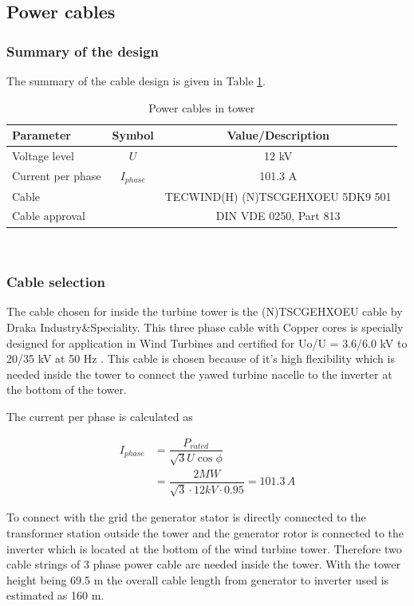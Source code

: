 \subsection{Power cables}

\subsubsection{Summary of the design}
The summary of the cable design is given in Table \ref{tab:power_cables}.

\begin{table}[h]
\centering
\caption{Power cables in tower}
\label{tab:power_cables}
\begin{tabular}{ |l|c|c|} 
\hline
\textbf{Parameter} & Symbol & \textbf{Value/Description}  \\ 
\hline
Voltage level & $U$ & 12 kV\\
\hline
Current per phase & $I_{phase}$ & 101.3 A\\
\hline
Cable & & TECWIND(H) (N)TSCGEHXOEU 5DK9 501  \\
\hline
Cable approval & & DIN VDE 0250, Part 813 \\
\hline
\end{tabular} \\
\end{table}

\subsubsection{Cable selection}

The cable chosen for inside the turbine tower is the (N)TSCGEHXOEU cable by Draka Industry\&Speciality. This three phase cable with Copper cores is specially designed for application in Wind Turbines and certified for  Uo/U = 3.6/6.0 kV to 20/35 kV at 50 Hz \cite{Draka}. This cable is chosen because of it's high flexibility which is needed inside the tower to connect the yawed turbine nacelle to the inverter at the bottom of the tower.

The current per phase is calculated as

\begin{align}
    I_{phase} &= \dfrac{P_{rated}}{\sqrt{3}U \cos \phi} \\
    &= \dfrac{2 MW}{\sqrt{3} \cdot 12 kV \cdot 0.95} = 101.3\,A \nonumber
\end{align}

To connect with the grid the generator stator is directly connected to the transformer station outside the tower and the generator rotor is connected to the inverter which is located at the bottom of the wind turbine tower. Therefore two cable strings of 3 phase power cable are needed inside the tower. With the tower height being 69.5 m the overall cable length from generator to inverter used is estimated as 160 m. 

